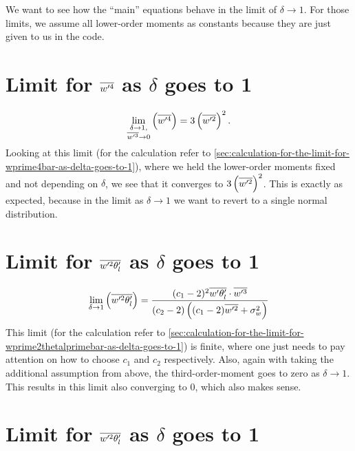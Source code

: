 We want to see how the \enquote{main} equations behave in the limit of $\delta \to 1$.
For those limits, we assume all lower-order moments as constants because they are just given to us in the code.


\section{Limit for \texorpdfstring{$\overline{w'^4}$}{wprime4bar} as \texorpdfstring{$\delta$}{delta} goes to 1}
\label{sec:limit-for-wprime4bar-as-delta-goes-to-1}

\begin{align}
    \label{eq:limit_wprime4_delta_to_1}
    \lim_{\substack{\delta \to 1, \\ \overline{w'^3} \to 0}}
    \left(\overline{w'^4}\right)
    = 3 \left(\overline{w'^2}\right)^2.
\end{align}
Looking at this limit (for the calculation refer to \cref{sec:calculation-for-the-limit-for-wprime4bar-as-delta-goes-to-1}),
where we held the lower-order moments fixed and not depending on $\delta$,
we see that it converges to $3 \left(\overline{w'^2}\right)^2$.
This is exactly as expected,
because in the limit as $\delta \to 1$ we want to revert to a single normal distribution.


\section{Limit for \texorpdfstring{$\overline{w'^2 \theta_l'}$}{wprime2thetalbar} as \texorpdfstring{$\delta$}{delta} goes to 1}
\label{sec:limit-for-wprime2thetalbar-as-delta-goes-to-1}

\begin{align}
    \label{eq:limit_wprime2thetalbar_delta_to_1}
    \lim_{\delta \to 1}\left(\overline{w'^2 \theta_l'}\right)
    = \frac{(c_1 - 2)^2 \overline{w' \theta_l'} \cdot \overline{w'^3}}{(c_2 - 2)\left((c_1 - 2)\overline{w'^2} + \sigma_w^2\right)}
\end{align}
This limit (for the calculation refer to \cref{sec:calculation-for-the-limit-for-wprime2thetalprimebar-as-delta-goes-to-1})
is finite, where one just needs to pay attention on how to choose $c_1$ and $c_2$ respectively.
Also, again with taking the additional assumption from above,
the third-order-moment goes to zero as $\delta \to 1$.
This results in this limit also converging to 0,
which also makes sense.


\section{Limit for \texorpdfstring{$\overline{w'^2 \theta_l'}$}{wprimethetaltwobar} as \texorpdfstring{$\delta$}{delta} goes to 1}
\label{sec:limit-for-wprimethetal2bar-as-delta-goes-to-1}

